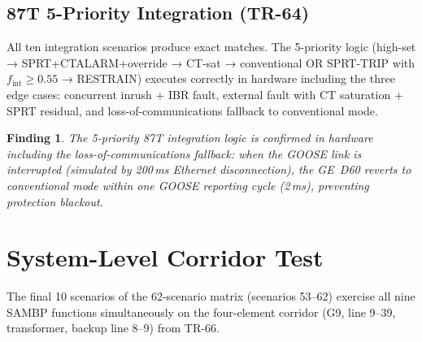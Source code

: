 \documentclass[11pt, a4paper]{article}
\newcommand{\fint}{f_{\mathrm{int}}}
\newtheorem{finding}{Finding}
\begin{document}
\subsection{87T 5-Priority Integration (TR-64)}

All ten integration scenarios produce exact matches.
The 5-priority logic (high-set → SPRT+CTALARM+override → CT-sat → conventional
OR SPRT-TRIP with $\fint \geq 0.55$ → RESTRAIN) executes correctly in
hardware including the three edge cases: concurrent inrush + IBR fault,
external fault with CT saturation + SPRT residual, and loss-of-communications
fallback to conventional mode.

\begin{finding}
The 5-priority 87T integration logic is confirmed in hardware including the
loss-of-communications fallback: when the GOOSE link is interrupted (simulated
by 200\,ms Ethernet disconnection), the GE~D60 reverts to conventional
mode within one GOOSE reporting cycle (2\,ms), preventing protection blackout.
\end{finding}

\section{System-Level Corridor Test}
\label{sec:corridor}

The final 10 scenarios of the 62-scenario matrix (scenarios 53--62) exercise
all nine SAMBP functions simultaneously on the four-element corridor
(G9, line 9--39, transformer, backup line 8--9) from TR-66.
\end{document}

